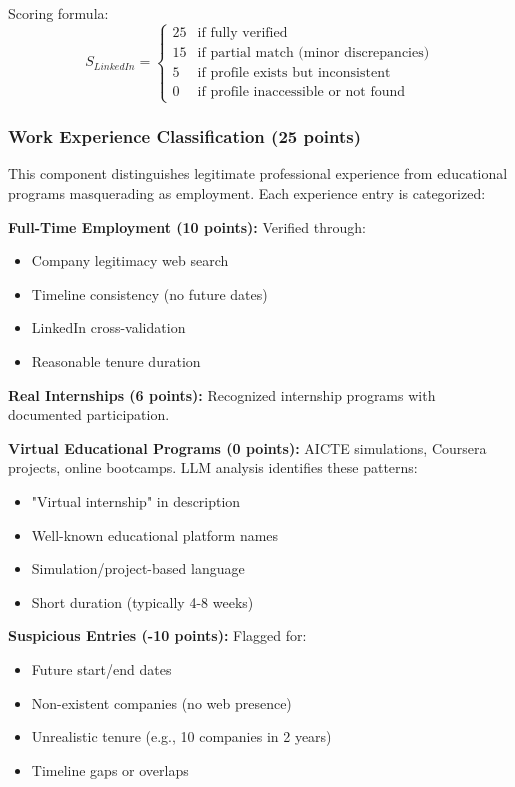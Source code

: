 \documentclass[conference]{IEEEtran}
\begin{document}
Scoring formula:
\begin{equation}
S_{LinkedIn} = 
\begin{cases}
25 & \text{if fully verified} \\
15 & \text{if partial match (minor discrepancies)} \\
5 & \text{if profile exists but inconsistent} \\
0 & \text{if profile inaccessible or not found}
\end{cases}
\end{equation}

\subsubsection{Work Experience Classification (25 points)}

This component distinguishes legitimate professional experience from educational programs masquerading as employment. Each experience entry is categorized:

\textbf{Full-Time Employment (10 points):} Verified through:
\begin{itemize}
    \item Company legitimacy web search
    \item Timeline consistency (no future dates)
    \item LinkedIn cross-validation
    \item Reasonable tenure duration
\end{itemize}

\textbf{Real Internships (6 points):} Recognized internship programs with documented participation.

\textbf{Virtual Educational Programs (0 points):} AICTE simulations, Coursera projects, online bootcamps. LLM analysis identifies these patterns:
\begin{itemize}
    \item "Virtual internship" in description
    \item Well-known educational platform names
    \item Simulation/project-based language
    \item Short duration (typically 4-8 weeks)
\end{itemize}

\textbf{Suspicious Entries (-10 points):} Flagged for:
\begin{itemize}
    \item Future start/end dates
    \item Non-existent companies (no web presence)
    \item Unrealistic tenure (e.g., 10 companies in 2 years)
    \item Timeline gaps or overlaps
\end{itemize}
\end{document}

